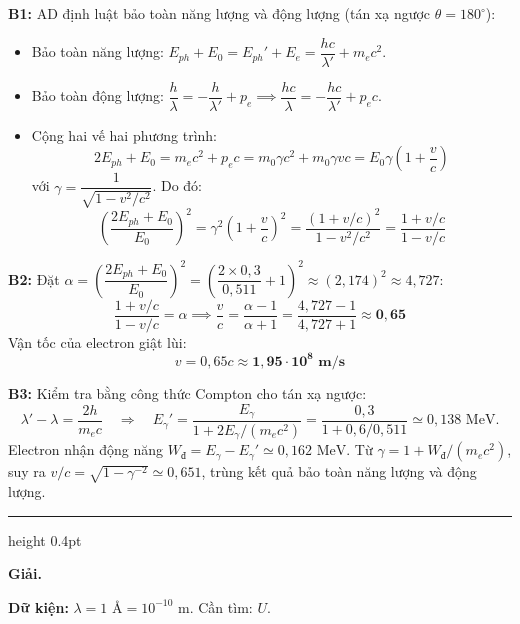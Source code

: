 \documentclass[11pt,a4paper]{article}
\renewcommand{\boldsymbol}[1]{\symbf{#1}}
\let\DeBaiOriginal\DeBai
\renewcommand{\DeBai}[1]{\par\Needspace{5\baselineskip}\DeBaiOriginal{#1}}
\newcommand{\PhanCachBai}{%
  \par\Needspace{7\baselineskip}%
  \addvspace{6pt}%
  {\color{black!40}\hrule height 0.4pt}%
  \nobreak\vspace{7pt}\nobreak
}
\begin{document}
\textbf{B1:} AD định luật bảo toàn năng lượng và động lượng (tán xạ ngược $\theta = 180^\circ$):
\begin{itemize}[leftmargin=*, topsep=1pt, itemsep=1pt]
  \item Bảo toàn năng lượng: $E_{ph} + E_0 = E_{ph}' + E_e = \dfrac{h c}{\lambda'} + m_e c^2$.
  \item Bảo toàn động lượng: $\dfrac{h}{\lambda} = -\dfrac{h}{\lambda'} + p_e \implies \dfrac{h c}{\lambda} = -\dfrac{h c}{\lambda'} + p_e c$.
  \item Cộng hai vế hai phương trình:
  \begin{equation*}
      2 E_{ph} + E_0 = m_e c^2 + p_e c = m_0 \gamma c^2 + m_0 \gamma v c = E_0 \gamma \left(1 + \frac{v}{c}\right)
  \end{equation*}
  với $\gamma = \dfrac{1}{\sqrt{1 - v^2/c^2}}$. Do đó:
  \begin{equation*}
      \left(\frac{2 E_{ph} + E_0}{E_0}\right)^2 = \gamma^2 \left(1 + \frac{v}{c}\right)^2 = \frac{(1 + v/c)^2}{1 - v^2/c^2} = \frac{1 + v/c}{1 - v/c}
  \end{equation*}
\end{itemize}

\textbf{B2:} Đặt $\alpha = \left(\dfrac{2 E_{ph} + E_0}{E_0}\right)^2 = \left(\dfrac{2 \times 0{,}3}{0{,}511} + 1\right)^2 \approx (2{,}174)^2 \approx 4{,}727$:
\begin{equation*}
    \frac{1 + v/c}{1 - v/c} = \alpha \implies \frac{v}{c} = \frac{\alpha - 1}{\alpha + 1} = \frac{4{,}727 - 1}{4{,}727 + 1} \approx \boldsymbol{0{,}65}
\end{equation*}
Vận tốc của electron giật lùi:
\begin{equation*}
    v = 0{,}65 c \approx \boldsymbol{1{,}95 \cdot 10^8\text{ m/s}}
\end{equation*}


\textbf{B3:} Kiểm tra bằng công thức Compton cho tán xạ ngược:
\[
\lambda'-\lambda=\frac{2h}{m_ec}
\quad\Rightarrow\quad
E_\gamma'=\frac{E_\gamma}{1+2E_\gamma/(m_ec^2)}
=\frac{0{,}3}{1+0{,}6/0{,}511}\simeq0{,}138\text{ MeV}.
\]
Electron nhận động năng $W_{\text{đ}}=E_\gamma-E_\gamma'\simeq0{,}162\text{ MeV}$.
Từ $\gamma=1+W_{\text{đ}}/(m_ec^2)$, suy ra
$v/c=\sqrt{1-\gamma^{-2}}\simeq0{,}651$, trùng kết quả bảo toàn năng lượng và động lượng.

\PhanCachBai


\textbf{Giải.}

\textbf{Dữ kiện:} $\lambda = 1\text{ \AA} = 10^{-10}\text{ m}$. Cần tìm: $U$.
\end{document}
